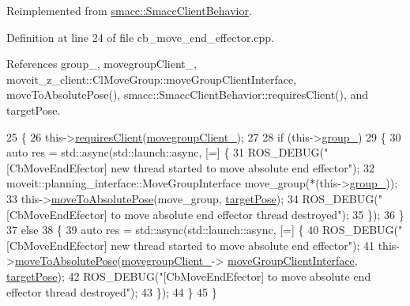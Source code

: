 Reimplemented from \hyperlink{classsmacc_1_1SmaccClientBehavior_a7962382f93987c720ad432fef55b123f}{smacc\+::\+Smacc\+Client\+Behavior}.



Definition at line 24 of file cb\+\_\+move\+\_\+end\+\_\+effector.\+cpp.



References group\+\_\+, movegroup\+Client\+\_\+, moveit\+\_\+z\+\_\+client\+::\+Cl\+Move\+Group\+::move\+Group\+Client\+Interface, move\+To\+Absolute\+Pose(), smacc\+::\+Smacc\+Client\+Behavior\+::requires\+Client(), and target\+Pose.


\begin{DoxyCode}
25 \{
26   this->\hyperlink{classsmacc_1_1SmaccClientBehavior_a917f001e763a1059af337bf4e164f542}{requiresClient}(\hyperlink{classmoveit__z__client_1_1CbMoveEndEffector_af62a434c16849885a085e30b8ae70e00}{movegroupClient\_});
27 
28   \textcolor{keywordflow}{if} (this->\hyperlink{classmoveit__z__client_1_1CbMoveEndEffector_ab2d23ae054dbc0c2a5f3e6bbc84e07dd}{group\_})
29   \{
30     \textcolor{keyword}{auto} res = std::async(std::launch::async, [=] \{
31       ROS\_DEBUG(\textcolor{stringliteral}{"[CbMoveEndEfector] new thread started to move absolute end effector"});
32       moveit::planning\_interface::MoveGroupInterface move\_group(*(this->\hyperlink{classmoveit__z__client_1_1CbMoveEndEffector_ab2d23ae054dbc0c2a5f3e6bbc84e07dd}{group\_}));
33       this->\hyperlink{classmoveit__z__client_1_1CbMoveEndEffector_a277108330d114671ed89dffb876a8a48}{moveToAbsolutePose}(move\_group, \hyperlink{classmoveit__z__client_1_1CbMoveEndEffector_abea9c6077733077baced34c6098c6140}{targetPose});
34       ROS\_DEBUG(\textcolor{stringliteral}{"[CbMoveEndEfector] to move absolute end effector thread destroyed"});
35     \});
36   \}
37   \textcolor{keywordflow}{else}
38   \{
39     \textcolor{keyword}{auto} res = std::async(std::launch::async, [=] \{
40       ROS\_DEBUG(\textcolor{stringliteral}{"[CbMoveEndEfector] new thread started to move absolute end effector"});
41       this->\hyperlink{classmoveit__z__client_1_1CbMoveEndEffector_a277108330d114671ed89dffb876a8a48}{moveToAbsolutePose}(\hyperlink{classmoveit__z__client_1_1CbMoveEndEffector_af62a434c16849885a085e30b8ae70e00}{movegroupClient\_}->
      \hyperlink{classmoveit__z__client_1_1ClMoveGroup_af86e046b837be0ef4afa9893d8808f20}{moveGroupClientInterface}, \hyperlink{classmoveit__z__client_1_1CbMoveEndEffector_abea9c6077733077baced34c6098c6140}{targetPose});
42       ROS\_DEBUG(\textcolor{stringliteral}{"[CbMoveEndEfector] to move absolute end effector thread destroyed"});
43     \});
44   \}
45 \}
\end{DoxyCode}
